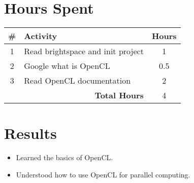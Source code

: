 \documentclass{article}
\begin{document}
\section*{Hours Spent}
\begin{tabular}{|c|l|c|}
    \hline
    \# & Activity & Hours \\
    \hline
    1 & Read brightspace and init project & 1 \\
    2 & Google what is OpenCL & 0.5 \\
    3 & Read OpenCL documentation & 2 \\
    \hline
    \multicolumn{2}{|r|}{\textbf{Total Hours}} & 4 \\
    \hline
\end{tabular}

\section*{Results}
\begin{itemize}
    \item Learned the basics of OpenCL.
    \item Understood how to use OpenCL for parallel computing.
\end{itemize}
\end{document}
